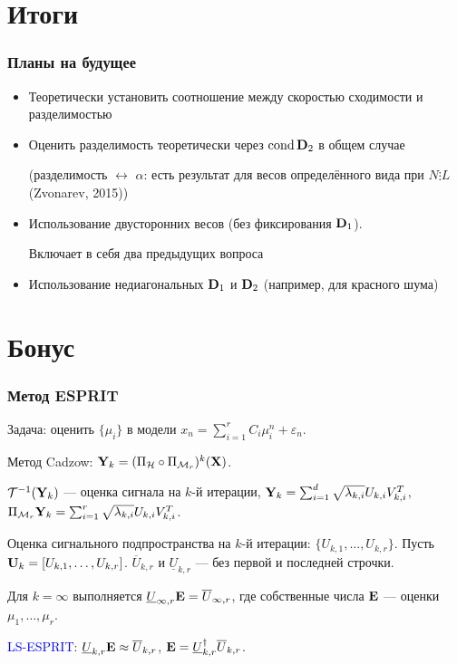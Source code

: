 \documentclass[unicode, notheorems]{beamer}
\DeclareMathOperator{\cond}{cond}
\begin{document}
\section{Итоги}

\begin{frame}
	\frametitle{Планы на будущее}
	\begin{itemize}
		\item Теоретически установить соотношение между скоростью сходимости и разделимостью
		\item Оценить разделимость теоретически через $\cond \bfD_2$ в общем случае
		
		(разделимость $\leftrightarrow$ $\alpha$: есть результат для весов определённого вида при $N \vdots L$ (Zvonarev, 2015))
		\item Использование двусторонних весов (без фиксирования $\mathbf{D}_1$).
		
		Включает в себя два предыдущих вопроса
		\item Использование недиагональных $\mathbf{D}_1$ и $\mathbf{D}_2$ (например, для красного шума)
	\end{itemize}
	
\end{frame}
\appendix
\section{Бонус}

\begin{frame}
	\frametitle{Метод ESPRIT}
	Задача: оценить $\{\mu_i\}$ в модели $x_n = \sum_{i = 1}^{r} C_i \mu_i^n + \varepsilon_n$.
	
	Метод Cadzow: $\mathbf{Y}_k = (\Pi_{\mathcal{H}} \circ \Pi_{\mathcal{M}_r})^k (\mathbf{X})$.
	
	$\mathcal{T}^{-1} (\mathbf{Y}_{k})$ --- оценка сигнала на $k$-й итерации, $\mathbf{Y}_{k} = \sum_{i = 1}^{d} \sqrt{\lambda_{k, i}} U_{k, i} V_{k, i}^T$, $\Pi_{\mathcal{M}_r} \mathbf{Y}_{k} = \sum_{i = 1}^{r} \sqrt{\lambda_{k, i}} U_{k, i} V_{k, i}^T$.
	
	Оценка сигнального подпространства на $k$-й итерации: $\{U_{k, 1}, \ldots, U_{k, r}\}$. Пусть $\mathbf{U}_k = [U_{k, 1}, \ldots, U_{k, r}]$. $\overline{U}_{k, r}$ и $\underline{U}_{k, r}$ --- без первой и последней строчки.
	
	\vspace{0.2cm}
	Для $k = \infty$ выполняется $\underline{U}_{\infty, r} \mathbf{E} = \overline{U}_{\infty, r}$, где собственные числа $\mathbf{E}$ --- оценки $\mu_1, \ldots, \mu_r$.
	
	\vspace{0.2cm}
	\textcolor{blue}{LS-ESPRIT}:  $\underline{U}_{k, r} \mathbf{E} \approx \overline{U}_{k, r}$, $\mathbf{E} = \underline{U}_{k, r}^\dagger \overline{U}_{k, r}$.
\end{frame}
\end{document}
